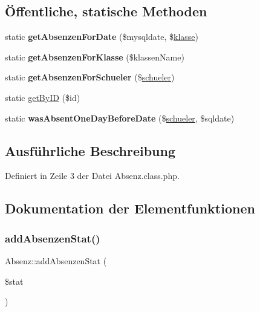 \subsection*{Öffentliche, statische Methoden}
\begin{DoxyCompactItemize}
\item 
\mbox{\label{class_absenz_aa60f20864fd305a85e32b16e6934689d}} 
static {\bfseries get\+Absenzen\+For\+Date} (\$mysqldate, \$\mbox{\hyperlink{classklasse}{klasse}})
\item 
\mbox{\label{class_absenz_a1c3696f179faddcb2528cf2e59fe331d}} 
static {\bfseries get\+Absenzen\+For\+Klasse} (\$klassen\+Name)
\item 
\mbox{\label{class_absenz_ae36f6820c00b2bef67292ae38023fd32}} 
static {\bfseries get\+Absenzen\+For\+Schueler} (\$\mbox{\hyperlink{classschueler}{schueler}})
\item 
static \mbox{\hyperlink{class_absenz_a989ac363723e8de5ad94d494fa03f640}{get\+By\+ID}} (\$id)
\item 
\mbox{\label{class_absenz_ad0f17438acb00139400b4cbd0d5bbb75}} 
static {\bfseries was\+Absent\+One\+Day\+Before\+Date} (\$\mbox{\hyperlink{classschueler}{schueler}}, \$sqldate)
\end{DoxyCompactItemize}


\subsection{Ausführliche Beschreibung}


Definiert in Zeile 3 der Datei Absenz.\+class.\+php.



\subsection{Dokumentation der Elementfunktionen}
\mbox{\label{class_absenz_aa0c15976f31b48577c02820115d25488}} 
\subsubsection{\texorpdfstring{add\+Absenzen\+Stat()}{addAbsenzenStat()}}
{\footnotesize\ttfamily Absenz\+::add\+Absenzen\+Stat (\begin{DoxyParamCaption}\item[{}]{\$stat }\end{DoxyParamCaption})}

